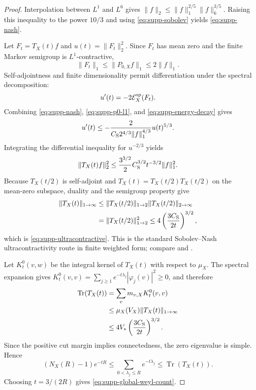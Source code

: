 \documentclass[11pt]{article}
\numberwithin{equation}{section}
\theoremstyle{definition}
\theoremstyle{remark}
\newcommand{\Tr}{\operatorname{Tr}}
\begin{document}
\begin{proof}
Interpolation between $L^1$ and $L^6$ gives
$\|f\|_2\le\|f\|_1^{2/5}\|f\|_6^{3/5}$.  Raising this inequality to the
power $10/3$ and using \eqref{eq:supp-sobolev} yields
\eqref{eq:supp-nash}.

Let $F_t=T_X(t)f$ and $u(t)=\|F_t\|_2^2$.  Since $F_t$ has mean zero and the
finite Markov semigroup is $L^1$-contractive,
\begin{equation}
 \|F_t\|_1
 \le\|P_{0,X}f\|_1
 \le2\|f\|_1.
 \label{eq:supp-p0-l1}
\end{equation}
Self-adjointness and finite dimensionality permit differentiation under the
spectral decomposition:
\begin{equation}
 u'(t)=-2\mathcal E_X^{\rm sp}(F_t).
 \label{eq:supp-energy-decay}
\end{equation}
Combining \eqref{eq:supp-nash}, \eqref{eq:supp-p0-l1}, and
\eqref{eq:supp-energy-decay} gives
\begin{equation}
 u'(t)
 \le-\frac{2}{C_{\rm S}2^{4/3}\|f\|_1^{4/3}}u(t)^{5/3}.
 \label{eq:supp-nash-ode}
\end{equation}
Integrating the differential inequality for $u^{-2/3}$ yields
\begin{equation}
 \|T_X(t)f\|_2^2
 \le \frac{3^{3/2}}{2}C_{\rm S}^{3/2}t^{-3/2}\|f\|_1^2.
 \label{eq:supp-l1-l2}
\end{equation}
Because $T_X(t/2)$ is self-adjoint and
$T_X(t)=T_X(t/2)T_X(t/2)$ on the mean-zero subspace, duality and the semigroup
property give
\begin{align}
 \|T_X(t)\|_{1\to\infty}
 &\le\|T_X(t/2)\|_{1\to2}\|T_X(t/2)\|_{2\to\infty} \\
 &=\|T_X(t/2)\|_{1\to2}^2
 \le4\left(\frac{3C_{\rm S}}{2t}\right)^{3/2},
\end{align}
which is \eqref{eq:supp-ultracontractive}.  This is the standard
Sobolev--Nash ultracontractivity route in finite weighted form; compare
\cite[Chs.~10--11]{Chung1997} and \cite{SaloffCoste2002}.

Let $K_t^0(v,w)$ be the integral kernel of $T_X(t)$ with respect to $\mu_X$.
The spectral expansion gives
$K_t^0(v,v)=\sum_{j\ge1}e^{-t\lambda_j}|\varphi_j(v)|^2\ge0$, and therefore
\begin{align}
 \Tr(T_X(t))
 &=\sum_v m_{v,X}K_t^0(v,v) \\
 &\le \mu_X(V_X)\|T_X(t)\|_{1\to\infty} \\
 &\le4V_*\left(\frac{3C_{\rm S}}{2t}\right)^{3/2}.
 \label{eq:supp-heat-trace}
\end{align}
Since the positive cut margin implies connectedness, the zero eigenvalue is
simple.  Hence
\begin{equation}
 (N_X(R)-1)e^{-tR}
 \le\sum_{0<\lambda_j\le R}e^{-t\lambda_j}
 \le\Tr(T_X(t)).
 \label{eq:supp-counting-trace}
\end{equation}
Choosing $t=3/(2R)$ gives \eqref{eq:supp-global-weyl-count}.
\end{proof}
\end{document}
